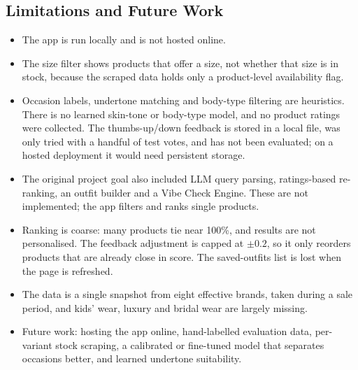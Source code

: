 \subsection{Limitations and Future Work}
\begin{itemize}
  \item The app is run locally and is not hosted online.
  \item The size filter shows products that offer a size, not whether that size is in stock, because the scraped data holds only a product-level availability flag.
  \item Occasion labels, undertone matching and body-type filtering are heuristics. There is no learned skin-tone or body-type model, and no product ratings were collected. The thumbs-up/down feedback is stored in a local file, was only tried with a handful of test votes, and has not been evaluated; on a hosted deployment it would need persistent storage.
  \item The original project goal also included LLM query parsing, ratings-based re-ranking, an outfit builder and a Vibe Check Engine. These are not implemented; the app filters and ranks single products.
  \item Ranking is coarse: many products tie near 100\%, and results are not personalised. The feedback adjustment is capped at $\pm0.2$, so it only reorders products that are already close in score. The saved-outfits list is lost when the page is refreshed.
  \item The data is a single snapshot from eight effective brands, taken during a sale period, and kids' wear, luxury and bridal wear are largely missing.
  \item Future work: hosting the app online, hand-labelled evaluation data, per-variant stock scraping, a calibrated or fine-tuned model that separates occasions better, and learned undertone suitability.
\end{itemize}